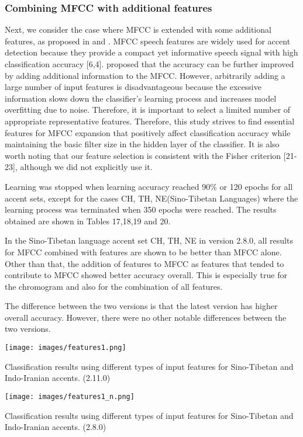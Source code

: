 \documentclass[ams]{U-AizuGT}
\begin{document}
\subsubsection{Combining MFCC with additional features}
Next, we consider the case where MFCC is extended with some additional features, as proposed in \cite{Singh:fea} and \cite{Veranika:lang}. MFCC speech features are widely used for accent detection because they provide a compact yet informative speech signal with high classification accuracy [6,4]. proposed that the accuracy can be further improved by adding additional information to the MFCC. However, arbitrarily adding a large number of input features is disadvantageous because the excessive information slows down the classifier's learning process and increases model overfitting due to noise. Therefore, it is important to select a limited number of appropriate representative features. Therefore, this study strives to find essential features for MFCC expansion that positively affect classification accuracy while maintaining the basic filter size in the hidden layer of the classifier. It is also worth noting that our feature selection is consistent with the Fisher criterion [21-23], although we did not explicitly use it.\par
Learning was stopped when learning accuracy reached 90\% or 120 epochs for all accent sets, except for the cases {CH, TH, NE}(Sino-Tibetan Languages) where the learning process was terminated when 350 epochs were reached. The results obtained are shown in Tables 17,18,19 and 20.\par
In the Sino-Tibetan language accent set {CH, TH, NE} in version 2.8.0, all results for MFCC combined with features are shown to be better than MFCC alone. Other than that, the addition of features to MFCC as features that tended to contribute to MFCC showed better accuracy overall. This is especially true for the chromogram and also for the combination of all features.\par
The difference between the two versions is that the latest version has higher overall accuracy. However, there were no other notable differences between the two versions.
\begin{table}[h]
    \centering
    \texttt{[image: images/features1.png]}
    \caption{Classification results using different types of input features for Sino-Tibetan and Indo-Iranian accents. (2.11.0)}
\end{table}
\begin{table}[h]
    \centering
    \texttt{[image: images/features1\_n.png]}
    \caption{Classification results using different types of input features for Sino-Tibetan and Indo-Iranian accents. (2.8.0)}
\end{table}
\end{document}
